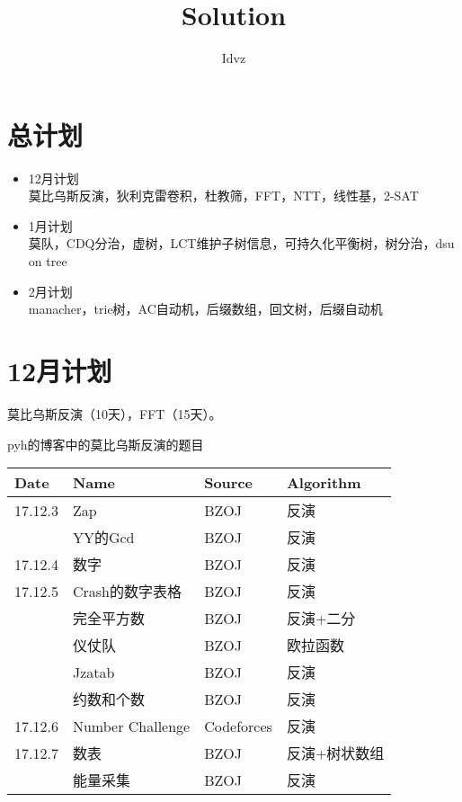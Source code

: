 \documentclass{ctexart}
\title{Solution}
\author{Idvz}
\begin{document}
\date{}
\maketitle





\section{总计划}
\begin{itemize}
\item 12月计划\\
  莫比乌斯反演，狄利克雷卷积，杜教筛，FFT，NTT，线性基，2-SAT
\item 1月计划\\
  莫队，CDQ分治，虚树，LCT维护子树信息，可持久化平衡树，树分治，dsu on tree
\item 2月计划\\
  manacher，trie树，AC自动机，后缀数组，回文树，后缀自动机
\end{itemize}
  

\section{12月计划}

莫比乌斯反演（10天），FFT（15天）。

pyh的博客中的莫比乌斯反演的题目

\begin{table}  
  \begin{center}  
    \begin{tabular*}{12cm}{llll}
      Date & Name & Source  & Algorithm\\
      \hline
      17.12.3 & Zap & BZOJ & 反演\\
      & YY的Gcd & BZOJ & 反演\\
      \hline
      17.12.4 & 数字 & BZOJ  & 反演\\
      \hline
      17.12.5 & Crash的数字表格 & BZOJ  & 反演\\
      & 完全平方数 & BZOJ  & 反演+二分\\
      & 仪仗队 & BZOJ  & 欧拉函数\\
      & Jzatab & BZOJ  & 反演\\
      & 约数和个数 & BZOJ  & 反演\\
      \hline
      17.12.6 & Number Challenge & Codeforces  & 反演\\
      \hline
      17.12.7 & 数表 & BZOJ & 反演+树状数组\\
      & 能量采集 & BZOJ  & 反演\\
    \end{tabular*}  
  \end{center}  
\end{table}  
\end{document}
